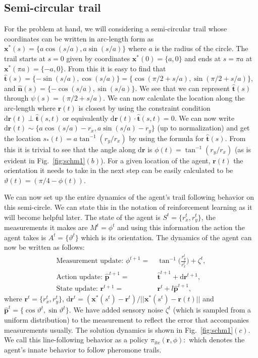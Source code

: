 \documentclass[%
reprint,
superscriptaddress,
floatfix,
amsmath,
amssymb,
aps,
notitlepage
]{revtex4-1}
\def\d{\text{d}}
\def\r{\mathbf{r}}
\def\xst{\mathbf{x}^*}
\def\th{\hat{\mathbf{t}}}
\def\ph{\hat{\mathbf{p}}}
\def\nh{\hat{\mathbf{n}}}
\def\ite{\text{ite}}
\def\theta{\vartheta}
\begin{document}
\subsection{Semi-circular trail}
For the problem at hand, we will considering a semi-circular trail whose coordinates can be
written in arc-length form as $\xst(s) = \{ a \cos(s/a), a \sin(s/a) \}$ where $a$ is the radius
of the circle. The trail starts at $s=0$ given by coordinates $\xst(0) = \{ a, 0 \}$ and ends at
$s=\pi a$ at $\xst (\pi a) = \{ -a, 0 \}$. From this it is easy to find that $\th(s) = \{ -\sin(s/a) , \cos(s/a) \}
= \{ \cos(\pi/2 + s/a), \sin(\pi/2 + s/a) \}$, and $\nh(s) = \{ -\cos(s/a) , \sin(s/a) \}$. We see that we
can represent $\th(s)$ through $\psi(s) = (\pi/2 + s/a)$. We can now calculate the location along the arc-length
where $\r(t)$ is closest by using the constraint condition $\d\r(t) \perp \th(s,t)$ or equivalently $\d\r(t)
\cdot \th(s,t) = 0$. We can now write $\d \r(t) \sim \{ a \cos(s/a) - r_x, a \sin(s/a) - r_y \}$
(up to normalization) and get the location $s_*(t) = a \tan^{-1}(r_y/r_x)$ by using the formula
for $\th(s)$. From this it is trivial to see that the angle along $\d \r$ is $\phi(t) = \tan^{-1}(r_y/r_x)$
(as is evident in Fig.~\ref{fig:schm1}$(b)$). For a given location of the agent, $\r(t)$ the orientation
it needs to take in the next step can be easily calculated to be $\theta(t) = (\pi/4 - \phi(t))$.

We can now set up the entire dynamics of the agent's trail following behavior on this semi-circle. We can state this
in the notation of reinforcement learning as it will become helpful later. The state of the agent
is $S^t = \{ r_x^t, r_y^t \}$, the measurements it makes are $M^t = \phi^t$ and using this information
the action the agent takes is $A^t = \{ \theta^t \}$ which is its orientation. The dynamics of
the agent can now be written as follows:
\begin{align}
    \text{Measurement update: } \phi^{t+1} = & \ \tan^{-1} \bigg( \frac{r_y^t}{r_x^t} \bigg) + \zeta^t, \\
    \text{Action update: }\ph^{t+1} =& \ \th^{t+1} + \d\r^{t+1}, \\
    \text{State update: } \r^{t+1} =& \ \r^t + l \ph^{t+1},
\end{align}
where $\r^t = \{ r_x^t, r_y^t \}$, $\d\r^t = (\xst(s^t)-\r^t)/||\xst(s^t)-\r(t)||$ and $\ph^t = \{ \cos \theta^t, \sin \theta^t \}$.
We have added sensory noise $\zeta^t$ (which is sampled from a uniform distribution) to the measurement
to reflect the error that accompanies measurements usually. The solution dynamics is shown
in Fig.~\ref{fig:schm1}$(c)$. We call this line-following behavior as a policy
$\pi_\ite(\r, \phi): $
which denotes the agent's innate behavior to follow pheromone trails.
\end{document}
